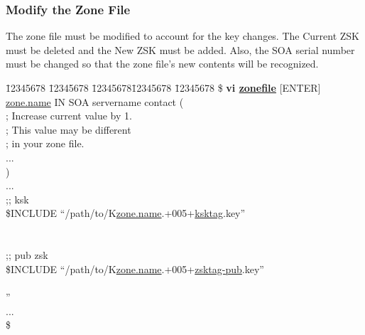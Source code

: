 
\subsubsection{Modify the Zone File}

The zone file must be modified to account for the key changes.  The Current
ZSK must be deleted and the New ZSK must be added.  Also, the SOA serial
number must be changed so that the zone file's new contents will be recognized.

\begin{tabbing}
\hspace{0.5in} \= 12345678 \= 12345678 \= 12345678\= 12345678 \= 12345678 \kill
\hspace{0.5in}\$ {\bf vi \underline{zonefile}} $[$ENTER$]$ \\
\hspace{0.5in}\underline{zone.name} \> \> \> IN \> SOA \> servername contact (\\
\hspace{3.5in}{\bf 2005092102} ; Increase current value by 1. \\
\hspace{4.4in};  This value may be different \\
\hspace{4.4in}; in your zone file. \\
\hspace{0.5in}\>           \>         ... \\
\hspace{0.5in}\>              ) \\
\hspace{0.5in}... \\
\hspace{0.5in};; ksk \\
\hspace{0.5in}\$INCLUDE ``/path/to/K\underline{zone.name}.+005+\underline{ksktag}.key'' \\
 \\
 \\
\hspace{0.5in};; pub zsk \\
\hspace{0.5in}\$INCLUDE ``/path/to/K\underline{zone.name}.+005+\underline{zsktag-pub}.key'' \\
\hspace{0.5in}{\bf ;; new zsk} \\
'' \\
\hspace{0.5in}... \\
\hspace{0.5in}\$ \\
\end{tabbing}
